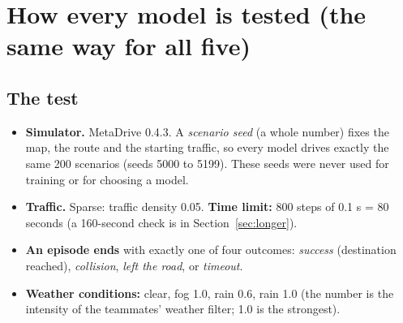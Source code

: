 \documentclass[11pt,a4paper]{article}
\begin{document}
\section{How every model is tested (the same way for all five)}\label{sec:testing}
\subsection{The test}
\begin{itemize}
\item \textbf{Simulator.} MetaDrive 0.4.3. A \emph{scenario seed} (a whole number) fixes the map, the route and the starting traffic, so every model drives exactly the same 200 scenarios (seeds 5000 to 5199). These seeds were never used for training or for choosing a model.
\item \textbf{Traffic.} Sparse: traffic density 0.05. \textbf{Time limit:} 800 steps of 0.1 s = 80 seconds (a 160-second check is in Section~\ref{sec:longer}).
\item \textbf{An episode ends} with exactly one of four outcomes: \emph{success} (destination reached), \emph{collision}, \emph{left the road}, or \emph{timeout}.
\item \textbf{Weather conditions:} clear, fog 1.0, rain 0.6, rain 1.0 (the number is the intensity of the teammates' weather filter; 1.0 is the strongest).
\end{itemize}
\end{document}
